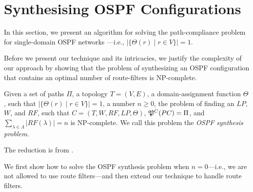 \section{Synthesising OSPF Configurations} \label{sec:synthesis}
In this section, we present an algorithm for 
solving the path-compliance problem for 
single-domain OSPF networks
---i.e., $|\{\Theta(r) \mid r\in V\}|=1$.


Before we present our technique and its intricacies,
we justify the complexity of our approach by showing that
the problem of synthesizing an OSPF configuration
that contains an optimal number of route-filters is NP-complete.

\begin{theorem}
Given a set of paths $\Pi$,
a topology $T=(V,E)$,
a domain-assignment function $\Theta$, such that $|\{\Theta(r) \mid r\in V\}|=1$,
a number $n\geq 0$,
the problem of finding 
an $LP$, $W$, and $RF$,  such that
$C=(T,W,RF,LP,\Theta)$,
$\mathfrak{P}^C(PC) = \Pi$,
and 
$\sum_{\lambda\in\Lambda} |RF(\lambda)|=n$ is NP-complete.
We call this problem the \emph{OSPF synthesis problem}.
\end{theorem}
\iffull

\else
The reduction is from .
\fi

We first show how to solve the OSPF synthesis problem when $n=0$---i.e., we are not allowed to use route filters---and
then extend our technique to handle route filters.


